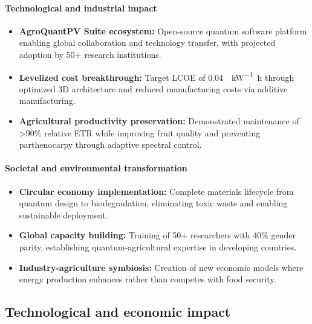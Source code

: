 \documentclass[12pt, a4paper]{article}
\begin{document}
\paragraph{Technological and industrial impact}
\begin{itemize}
    \item \textbf{AgroQuantPV Suite ecosystem:} Open-source quantum software platform enabling global collaboration and technology transfer, with projected adoption by 50+ research institutions.
    
    \item \textbf{Levelized cost breakthrough:} Target LCOE of \SI{0.04}{\dollar\per\kilo\watt\hour} through optimized 3D architecture and reduced manufacturing costs via additive manufacturing.
    
    \item \textbf{Agricultural productivity preservation:} Demonstrated maintenance of >90\% relative ETR while improving fruit quality and preventing parthenocarpy through adaptive spectral control.
\end{itemize}

\paragraph{Societal and environmental transformation}
\begin{itemize}
    \item \textbf{Circular economy implementation:} Complete materials lifecycle from quantum design to biodegradation, eliminating toxic waste and enabling sustainable deployment.
    
    \item \textbf{Global capacity building:} Training of 50+ researchers with 40\% gender parity, establishing quantum-agricultural expertise in developing countries.
    
    \item \textbf{Industry-agriculture symbiosis:} Creation of new economic models where energy production enhances rather than competes with food security.
\end{itemize}

\subsection{Technological and economic impact}
\end{document}
